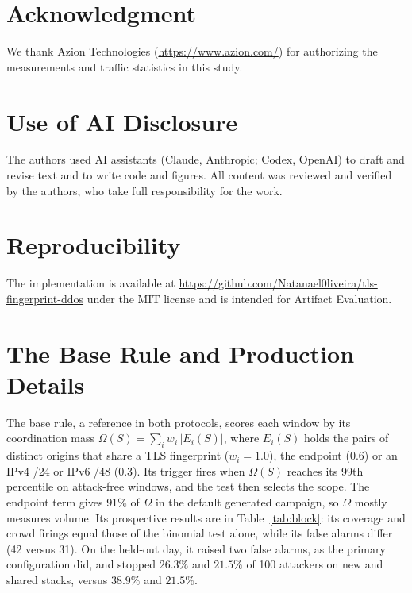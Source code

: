 \documentclass[conference,letterpaper,10pt]{IEEEtran}
\newcommand\1{\textit{(i)}}
\newcommand\2{\textit{(ii)}}
\newcommand\3{\textit{(iii)}}
\newcommand\4{\textit{(iv)}}
\newcommand\5{\textit{(v)}}
\newcommand\6{\textit{(vi)}}
\newcommand\7{\textit{(vii)}}
\newcommand\8{\textit{(viii)}}
\newcommand\9{\textit{(ix)}}
\begin{document}
\section*{Acknowledgment}

We thank Azion Technologies (\url{https://www.azion.com/})
for authorizing the measurements and traffic statistics
in this study.

\section*{Use of AI Disclosure}

The authors used AI assistants (Claude, Anthropic; Codex, OpenAI) to draft and revise text and to write code and figures. All content was reviewed and verified by the authors, who take full responsibility for the work. %

\section*{Reproducibility}

The implementation is available at \url{https://github.com/Natanael0liveira/tls-fingerprint-ddos} under the MIT license and is intended for Artifact Evaluation.




\appendices

\section{The Base Rule and Production Details}
\label{app:window}

The base rule, a reference in both protocols, scores each window by its coordination mass $\Omega(S) = \sum_i w_i\,|E_i(S)|$, where $E_i(S)$ holds the pairs of distinct origins that share a TLS fingerprint ($w_i = 1.0$), the endpoint ($0.6$) or an IPv4 /24 or IPv6 /48 ($0.3$). Its trigger fires when $\Omega(S)$ reaches its 99th percentile on attack-free windows, and the test then selects the scope. The endpoint term gives $91\%$ of $\Omega$ in the default generated campaign, so $\Omega$ mostly measures volume. Its prospective results are in Table~\ref{tab:block}: its coverage and crowd firings equal those of the binomial test alone, while its false alarms differ (42 versus 31). On the held-out day, it raised two false alarms, as the primary configuration did, and stopped $26.3\%$ and $21.5\%$ of 100 attackers on new and shared stacks, versus $38.9\%$ and $21.5\%$.
\end{document}
